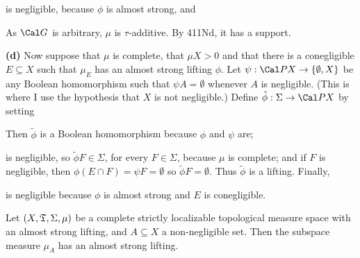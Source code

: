 { 
      
\noindent is negligible, because $\phi$ is almost strong, and 
      
      
\noindent As $\Cal G$ is arbitrary, $\mu$ is $\tau$-additive. 
By 411Nd, it has a support. 
      
\medskip 
      
{\bf (d)} Now suppose that $\mu$ is complete, that $\mu X>0$ and that 
there is a conegligible $E\subseteq X$ such that $\mu_E$ has an almost 
strong lifting $\phi$.   Let $\psi:\Cal PX\to\{\emptyset,X\}$ be any 
Boolean homomorphism such that $\psi A=\emptyset$ whenever $A$ is 
negligible.   (This is where I use the hypothesis that $X$ is not 
negligible.)   Define $\tilde\phi:\Sigma\to\Cal PX$ by setting 
      
      
\noindent Then $\tilde\phi$ is a Boolean homomorphism because $\phi$ and 
$\psi$ are; 
      
      
\noindent is negligible, so $\tilde\phi F\in\Sigma$, for every 
$F\in\Sigma$, because $\mu$ is complete;  and if $F$ is negligible, then 
$\phi(E\cap F)=\psi F=\emptyset$ so $\tilde\phi F=\emptyset$.   Thus 
$\tilde\phi$ is a lifting.   Finally, 
      
      
\noindent is negligible because $\phi$ is almost strong and $E$ is 
conegligible. 
}%
      
 Let $(X,\frak T,\Sigma,\mu)$ be a complete 
strictly localizable topological measure space with an almost strong 
lifting, and $A\subseteq X$ a non-negligible set.   Then the subspace 
measure $\mu_A$ has an almost strong lifting. 
      
